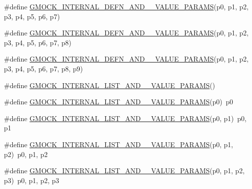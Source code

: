 \begin{DoxyCompactItemize}
\item 
\#define \mbox{\hyperlink{googletest-master_2googlemock_2include_2gmock_2gmock-generated-actions_8h_a028ed15e5ba3301a85b859792e9fb7c9}{G\+M\+O\+C\+K\+\_\+\+I\+N\+T\+E\+R\+N\+A\+L\+\_\+\+D\+E\+F\+N\+\_\+\+A\+N\+D\+\_\+\_\+\+V\+A\+L\+U\+E\+\_\+\+P\+A\+R\+A\+MS}}(p0,  p1,  p2,  p3,  p4,  p5,  p6,  p7)
\item 
\#define \mbox{\hyperlink{googletest-master_2googlemock_2include_2gmock_2gmock-generated-actions_8h_a9565bbd3c2624487ccb71f325fd96596}{G\+M\+O\+C\+K\+\_\+\+I\+N\+T\+E\+R\+N\+A\+L\+\_\+\+D\+E\+F\+N\+\_\+\+A\+N\+D\+\_\+\_\+\+V\+A\+L\+U\+E\+\_\+\+P\+A\+R\+A\+MS}}(p0,  p1,  p2,  p3,  p4,  p5,  p6,  p7,  p8)
\item 
\#define \mbox{\hyperlink{googletest-master_2googlemock_2include_2gmock_2gmock-generated-actions_8h_aea3f6f518db8ecc3b63341f38a7c4eaf}{G\+M\+O\+C\+K\+\_\+\+I\+N\+T\+E\+R\+N\+A\+L\+\_\+\+D\+E\+F\+N\+\_\+\+A\+N\+D\+\_\+\_\+\+V\+A\+L\+U\+E\+\_\+\+P\+A\+R\+A\+MS}}(p0,  p1,  p2,  p3,  p4,  p5,  p6,  p7,  p8,  p9)
\item 
\#define \mbox{\hyperlink{googletest-master_2googlemock_2include_2gmock_2gmock-generated-actions_8h_a2dbeccb9f6d632f5e7e2c1421cd549aa}{G\+M\+O\+C\+K\+\_\+\+I\+N\+T\+E\+R\+N\+A\+L\+\_\+\+L\+I\+S\+T\+\_\+\+A\+N\+D\+\_\+\_\+\+V\+A\+L\+U\+E\+\_\+\+P\+A\+R\+A\+MS}}()
\item 
\#define \mbox{\hyperlink{googletest-master_2googlemock_2include_2gmock_2gmock-generated-actions_8h_a12895511e72c47c78850542b68fe83d4}{G\+M\+O\+C\+K\+\_\+\+I\+N\+T\+E\+R\+N\+A\+L\+\_\+\+L\+I\+S\+T\+\_\+\+A\+N\+D\+\_\+\_\+\+V\+A\+L\+U\+E\+\_\+\+P\+A\+R\+A\+MS}}(p0)~p0
\item 
\#define \mbox{\hyperlink{googletest-master_2googlemock_2include_2gmock_2gmock-generated-actions_8h_ac0efec20319ea66c5508b6e5ad42c357}{G\+M\+O\+C\+K\+\_\+\+I\+N\+T\+E\+R\+N\+A\+L\+\_\+\+L\+I\+S\+T\+\_\+\+A\+N\+D\+\_\+\_\+\+V\+A\+L\+U\+E\+\_\+\+P\+A\+R\+A\+MS}}(p0,  p1)~p0, p1
\item 
\#define \mbox{\hyperlink{googletest-master_2googlemock_2include_2gmock_2gmock-generated-actions_8h_a10f92233f148b19f341e1a17267107d3}{G\+M\+O\+C\+K\+\_\+\+I\+N\+T\+E\+R\+N\+A\+L\+\_\+\+L\+I\+S\+T\+\_\+\+A\+N\+D\+\_\+\_\+\+V\+A\+L\+U\+E\+\_\+\+P\+A\+R\+A\+MS}}(p0,  p1,  p2)~p0, p1, p2
\item 
\#define \mbox{\hyperlink{googletest-master_2googlemock_2include_2gmock_2gmock-generated-actions_8h_a8df889711a5f99ed76736a2bc5030cf2}{G\+M\+O\+C\+K\+\_\+\+I\+N\+T\+E\+R\+N\+A\+L\+\_\+\+L\+I\+S\+T\+\_\+\+A\+N\+D\+\_\+\_\+\+V\+A\+L\+U\+E\+\_\+\+P\+A\+R\+A\+MS}}(p0,  p1,  p2,  p3)~p0, p1, p2, p3

\end{DoxyCompactItemize}
